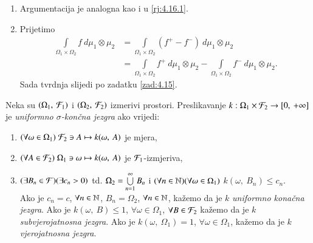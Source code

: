\begin{rj}[\ref{zad:4.16}]
\begin{enumerate}[label=(\roman*)]
        \item   \label{rj:4.16.2}
        Argumentacija je analogna kao i u \ref{rj:4.16.1}.
    
        \item   \label{rj:4.16.3}
        Prijetimo
        \begin{equation*}
            \begin{aligned}
                \int\limits_{\Omega_1 \times \Omega_2} f \: d \mu_1 \otimes \mu_2 &= \int\limits_{\Omega_1 \times \Omega_2} (f^+ - f^-) \: d \mu_1 \otimes \mu_2\\
                &= \int\limits_{\Omega_1 \times \Omega_2} f^+ \: d \mu_1 \otimes \mu_2 - \int\limits_{\Omega_1 \times \Omega_2} f^- \: d \mu_1 \otimes \mu_2.
            \end{aligned}
        \end{equation*}
        Sada tvrdnja slijedi po zadatku \ref{zad:4.15}.
    \end{enumerate}
\end{rj}

\begin{defn}    \label{defn:4.17}
    Neka su $({\Omega_1}, \: {\mathcal{F}_1})$ i $({\Omega_2}, \: {\mathcal{F}_2})$ izmerivi prostori. Preslikavanje $k : \Omega_1 \times \mathcal{F}_2 \to [{0}, \:{+\infty}]$ je \emph{uniformno $\sigma$-kon\v cna jezgra} ako vrijedi:
    \begin{enumerate}[label=(\alph*)]
        \item $(\forall \omega \in \Omega_1 ) \; \mathcal{F}_2 \ni A \mapsto k(\omega, \: A)$ je mjera,
        \item $(\forall A \in \mathcal{F}_2 ) \; \Omega_1 \ni \omega \mapsto k(\omega, \: A)$ je $\mathcal{F}_1$-izmjeriva,
        \item $(\exists B_n \in \mathcal{F})(\exists c_n > 0) $ td. $ \Omega_2 = \bigcup\limits_{n = 1}^{\infty} B_n$ i $(\forall n \in \mathbb{N})(\forall \omega \in \Omega_1)$ $k(\omega, \: B_n) \leq c_n$.\\
        Ako je $c_n = c$, $\forall n \in \mathbb{N}$, $B_n = \Omega_2$, $\forall n \in \mathbb{N}$, ka\v zemo da je $k$ \emph{uniformno kona\v cna jezgra}. Ako je $k(\omega, \: B) \leq 1$, $\forall \omega \in \Omega_1$, $\forall B \in \mathcal{F}_2$ ka\v zemo da je $k$ \emph{subvjerojatnosna jezgra}. Ako je $k(\omega, \: \Omega_1) = 1$, $\forall \omega \in \Omega_1$, ka\v zemo da je $k$ \emph{vjerojatnosna jezgra}.
    \end{enumerate}
\end{defn}

